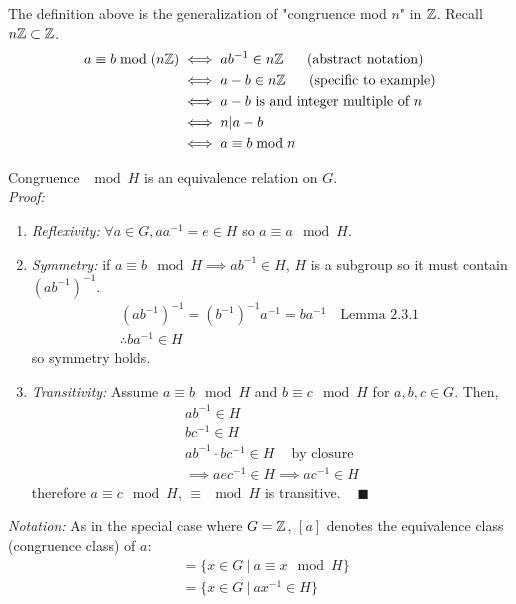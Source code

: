 \begin{example}
The definition above is the generalization of "congruence mod $n$" in ${\mathbb{ Z}}$. Recall $n{\mathbb{ Z}} \subset {\mathbb{ Z}}$.
\begin{align}
    a\equiv b\mod (n\Z) &\iff ab^{-1}\in n\Z \ \ \ \ \ \text{(abstract notation)}\nonumber \\
     &\iff a-b \in n\Z \ \ \ \ \ \text{(specific to example)}\nonumber \\
     &\iff a-b \text{ is and integer multiple of }n \nonumber \\
     &\iff n|a-b \nonumber \\
     &\iff a\equiv b\mod n \nonumber 
\end{align}
\end{example}
\begin{lemma}
Congruence $\mod H$ is an equivalence relation on $G$.\\
\textit{Proof:}\\
\begin{enumerate}
    \item \textit{Reflexivity:} $\forall a \in G, aa^{-1}=e\in H$ so $a\equiv a \mod H$.
    \item \textit{Symmetry:} if $a\equiv b \mod H \implies ab^{-1}\in H$, $H$ is a subgroup so it must contain $(ab^{-1})^{-1}$.
    \begin{align}
        (ab^{-1})^{-1}=(b^{-1})^{-1}a^{-1}=ba^{-1} \ \ \ \text{ Lemma 2.3.1 } \nonumber \\
        \therefore ba^{-1}\in H \nonumber
    \end{align}
    so symmetry holds.
    \item \textit{Transitivity:} Assume $a\equiv b \mod H$ and $b\equiv c \mod H$ for $a,b,c \in G$. Then,
    \begin{align}
        ab^{-1}\in H \nonumber \\
        bc^{-1}\in H \nonumber \\
        ab^{-1}\cdot bc^{-1}\in H \ \ \ \ \text{ by closure}\nonumber \\
        \implies aec^{-1}\in H \implies ac^{-1}\in H \nonumber
    \end{align}
    therefore $a\equiv c \mod H$, $\equiv \mod H$ is transitive. $\ \ \ \ \blacksquare$
\end{enumerate}
\textit{Notation:} As in the special case where $G={\mathbb{ Z}}$, $[a]$ denotes the equivalence class (congruence class) of $a$:
\begin{align}
    [a]&=\{x\in G \ | \ a\equiv x\mod H\} \nonumber \\
    &=\{x\in G \ | \ a x^{-1} \in H\} \nonumber
\end{align}
\end{lemma}
